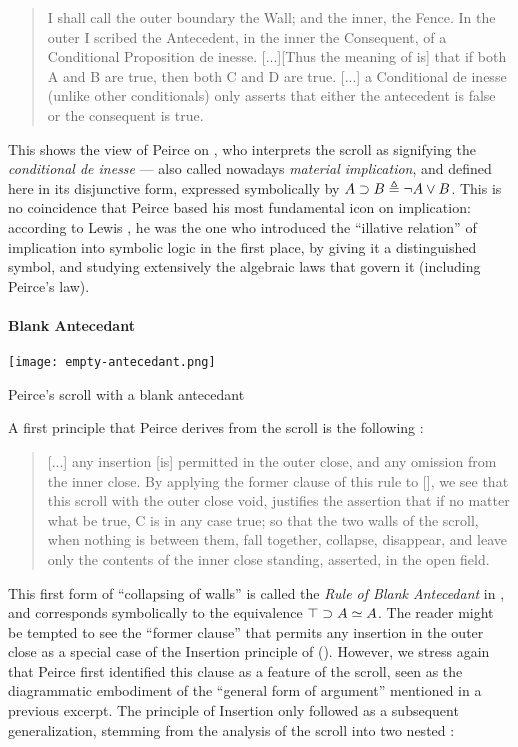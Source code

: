 \begin{quote}
  I shall call the outer boundary the Wall; and the inner, the Fence. In the
outer I scribed the Antecedent, in the inner the Consequent, of a Conditional
Proposition de inesse. [...][Thus the meaning of  is] that if
both A and B are true, then both C and D are true. [...] a Conditional de inesse
(unlike other conditionals) only asserts that either the antecedent is false or
the consequent is true. 
\end{quote}

This shows the  view of Peirce on , who interprets the scroll as
signifying the \textit{conditional de inesse} --- also called nowadays
\emph{material implication}, and defined here in its disjunctive form, expressed
symbolically by $A \supset B \triangleq \neg A \lor B$. This is no coincidence that
Peirce based his most fundamental icon on implication: according to Lewis
, he was the one who introduced the
``illative relation'' of implication into symbolic logic in the first place, by
giving it a distinguished symbol, and studying extensively the algebraic laws
that govern it (including Peirce's law).

\paragraph{Blank Antecedant}

\begin{marginfigure}
  \texttt{[image: empty-antecedant.png]}
  \caption{Peirce's scroll with a blank antecedant}
\end{marginfigure}

A first principle that Peirce derives from the scroll is the following
\cite[p.~534]{peirce_prolegomena_1906}:

\begin{quote}
  [...] any insertion [is] permitted in the outer close, and any omission from
the inner close. By applying the former clause of this rule to
[], we see that this scroll with the outer close void,
justifies the assertion that if no matter what be true, C is in any case true;
so that the two walls of the scroll, when nothing is between them, fall
together, collapse, disappear, and leave only the contents of the inner close
standing, asserted, in the open field.
\end{quote}

This first form of ``collapsing of walls'' is called the \emph{Rule of Blank
Antecedant} in \cite{minghui_graphical_2019}, and corresponds symbolically to
the equivalence $\top \supset A \simeq A$. The reader might be tempted to see
the ``former clause'' that permits any insertion in the outer close as a special
case of the Insertion principle of  (). However, we
stress again that Peirce first identified this clause as a feature of the
scroll, seen as the diagrammatic embodiment of the ``general form of argument''
mentioned in a previous excerpt. The principle of Insertion only followed as a
subsequent generalization, stemming from the analysis of the scroll into two
nested  \cite[p.~535]{peirce_prolegomena_1906}:

